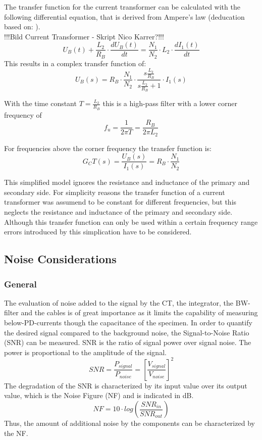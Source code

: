 The transfer function for the current transformer can be calculated with the following differential equation, that is derived from Ampere's law (deducation based on: \cite{highdynamiccurrent}).\\
!!!Bild Current Transformer - Skript Nico Karrer?!!!\\
\begin{equation}
U_B(t) + \frac{L_2}{R_B} \cdot \frac{dU_B(t)}{dt}=\frac{N_1}{N_2} \cdot L_2 \cdot \frac{dI_1(t)}{dt}
\end{equation}
This results in a complex transfer function of: 
\begin{equation}
U_B(s) = R_B \cdot \frac{N_1}{N_2} \cdot \frac{s \frac{L_2}{R_B}}{s \frac{L_2}{R_B} +1} \cdot I_1(s)
\end{equation}

With the time constant $T=\frac{L_2}{R_B}$ this is a high-pass filter with a lower corner frequency of 
\begin{equation}
f_u= \frac{1}{2 \pi T} = \frac{R_B}{2 \pi L_2}
\end{equation}

For frequencies above the corner frequency the transfer function is:
\begin{equation}
G_CT(s) = \frac{U_B(s)}{I_1(s)}=R_B \cdot \frac{N_1}{N_2}
\end{equation}

This simplified model ignores the resistance and inductance of the primary and secondary side. 
For simplicity reasons the transfer function of a current transformer was assumend to be constant for different frequencies, but this neglects the resistance and inductance of the primary and secondary side. Although this transfer function can only be used within a certain frequency range errors introduced by this simplication have to be considered. 


\subsection{Noise Considerations}
\subsubsection{General}
The evaluation of noise added to the signal by the CT, the integrator, the BW-filter and the cables is of great importance as it limits the capability of measuring below-PD-currents though the capacitance of the specimen. 
In order to quantify the desired signal compared to the background noise, the Signal-to-Noise Ratio (SNR) can be measured. SNR is  the ratio of signal power over signal noise. The power is proportional to the amplitude of the signal.
\begin{equation}
	SNR=\frac{P_{signal}}{P_{noise}} = \left[\frac{V_{signal}}{V_{noise}}\right]^2
\end{equation}
The degradation of the SNR is characterized by its input value over its output value, which is the Noise Figure (NF) and is indicated in dB.
\begin{equation}
	NF = 10\cdot log\left(\frac{SNR_{in}}{SNR_{out}}\right)
\end{equation}
Thus, the amount of additional noise by the components can be characterized by the NF. 
